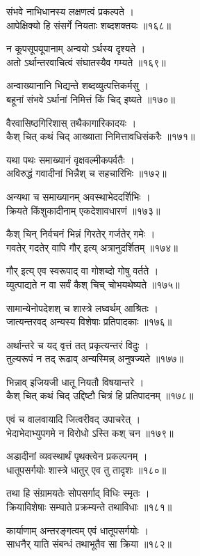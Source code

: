 संभवे नाभिधानस्य लक्षणत्वं प्रकल्पते ।\\आपेक्षिक्यो हि संसर्गे नियताः शब्दशक्तयः ॥१६८॥

न कूपसूपयूपानाम् अन्वयो ऽर्थस्य दृश्यते ।\\अतो ऽर्थान्तरवाचित्वं संघातस्यैव गम्यते ॥१६९॥

अन्वाख्यानानि भिद्यन्ते शब्दव्युत्पत्तिकर्मसु ।\\बहूनां संभवे ऽर्थानां निमित्तं किं चिद् इष्यते ॥१७०॥

वैरवासिष्ठगिरिशास् तथैकागारिकादयः ।\\कैश् चित् कथं चिद् आख्याता निमित्तावधिसंकरैः ॥१७१॥

यथा पथः समाख्यानं वृक्षवल्मीकपर्वतैः ।\\अविरुद्धं गवादीनां भिन्नैश् च सहचारिभिः ॥१७२॥

अन्यथा च समाख्यानम् अवस्थाभेददर्शिभिः ।\\क्रियते किंशुकादीनाम् एकदेशावधारणं ॥१७३॥

कैश् चिन् निर्वचनं भिन्नं गिरतेर् गर्जतेर् गमेः ।\\गवतेर् गदतेर् वापि गौर् इत्य् अत्रानुदर्शितम् ॥१७४॥

गौर् इत्य् एव स्वरूपाद् वा गोशब्दो गोषु वर्तते ।\\व्युत्पाद्यते न वा सर्वं कैश् चिच् चोभयथेष्यते ॥१७५॥

सामान्येनोपदेशश् च शास्त्रे लघ्वर्थम् आश्रितः ।\\जात्यन्तरवद् अन्यस्य विशेषाः प्रतिपादकाः ॥१७६॥

अर्थान्तरे च यद् वृत्तं तत् प्रकृत्यन्तरं विदुः ।\\तुल्यरूपं न तद् रूढाव् अन्यस्मिन्न् अनुषज्यते ॥१७७॥

भिन्नाव् इजियजी धातू नियतौ विषयान्तरे ।\\कैश् चित् कथं चिद् उद्दिष्टौ चित्रं हि प्रतिपादनम् ॥१७८॥

एवं च वालवायादि जित्वरीवद् उपाचरेत् ।\\भेदाभेदाभ्युपगमे न विरोधो ऽस्ति कश् चन ॥१७९॥

अडादीनां व्यवस्थार्थं पृथक्त्वेन प्रकल्पनम् ।\\धातूपसर्गयोः शास्त्रे धातुर् एव तु तादृशः ॥१८०॥

तथा हि संग्रामयतेः सोपसर्गाद् विधिः स्मृतः ।\\क्रियाविशेषाः सम्घाते प्रक्रम्यन्ते तथाविधाः ॥१८१॥

कार्याणाम् अन्तरङ्गत्वम् एवं धातूपसर्गयोः ।\\साधनैर् याति संबन्धं तथाभूतैव सा क्रिया ॥१८२॥

